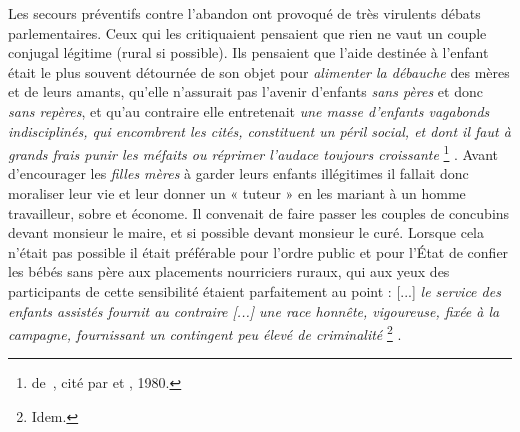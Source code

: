  Les secours préventifs contre l'abandon ont provoqué de très virulents débats parlementaires. Ceux qui les critiquaient pensaient que rien ne vaut un couple conjugal légitime (rural si possible). Ils pensaient que l'aide destinée à l'enfant était le plus souvent détournée de son objet pour \emph{alimenter la débauche} des mères et de leurs amants, qu'elle n'assurait pas l'avenir d'enfants \emph{sans pères} et donc \emph{sans repères}, et qu'au contraire elle entretenait \emph{une masse d'enfants vagabonds indisciplinés, qui encombrent les cités, constituent un péril social, et dont il faut à grands frais punir les méfaits ou réprimer l'audace toujours croissante}%
\footnote{de~, cité par  et , 1980.}%
. Avant d'encourager les \emph{filles mères} à garder leurs enfants illégitimes il fallait donc moraliser leur vie et leur donner un « tuteur » en les mariant à un homme travailleur, sobre et économe. Il convenait de faire passer les couples de concubins devant monsieur le maire, et si possible devant monsieur le curé. Lorsque cela n'était pas possible il était préférable pour l'ordre public et pour l'État de confier les bébés sans père aux placements nourriciers ruraux, qui aux yeux des participants de cette sensibilité étaient parfaitement au point : [...] \emph{le service des enfants assistés fournit au contraire \emph{[...]} une race honnête, vigoureuse, fixée à la campagne, fournissant un contingent peu élevé de criminalité}%
\footnote{Idem.}%
.

